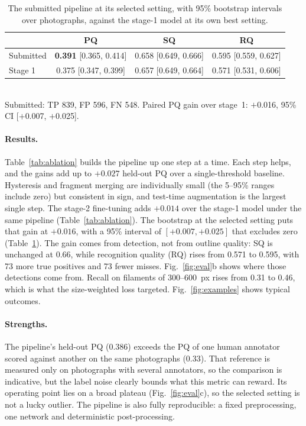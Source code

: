 \documentclass[sigconf]{acmart}
\begin{document}
\begin{table}[t]
  \caption{The submitted pipeline at its selected setting, with 95\% bootstrap intervals over photographs, against the stage-1 model at its own best setting.}
  \label{tab:final}
  \footnotesize\setlength{\tabcolsep}{3pt}
  \begin{tabular}{@{}lccc@{}}
    \toprule
     & PQ & SQ & RQ \\
    \midrule
    Submitted & \textbf{0.391} [0.365, 0.414] & 0.658 [0.649, 0.666] & 0.595 [0.559, 0.627] \\
    Stage 1   & 0.375 [0.347, 0.399] & 0.657 [0.649, 0.664] & 0.571 [0.531, 0.606] \\
    \bottomrule
  \end{tabular}\\[2pt]
  \footnotesize Submitted: TP 839, FP 596, FN 548. Paired PQ gain over stage~1: $+$0.016, 95\% CI [$+$0.007, $+$0.025].
\end{table}

\paragraph{Results.}
Table~\ref{tab:ablation} builds the pipeline up one step at a time. Each step helps, and the gains add up to $+0.027$ held-out PQ over a single-threshold baseline. Hysteresis and fragment merging are individually small (the 5--95\% ranges include zero) but consistent in sign, and test-time augmentation is the largest single step. The stage-2 fine-tuning adds $+0.014$ over the stage-1 model under the same pipeline (Table~\ref{tab:ablation}). The bootstrap at the selected setting puts that gain at $+0.016$, with a 95\% interval of $[+0.007, +0.025]$ that excludes zero (Table~\ref{tab:final}). The gain comes from detection, not from outline quality: SQ is unchanged at 0.66, while recognition quality (RQ) rises from 0.571 to 0.595, with 73 more true positives and 73 fewer misses. Fig.~\ref{fig:eval}b shows where those detections come from. Recall on filaments of 300--600~px rises from 0.31 to 0.46, which is what the size-weighted loss targeted. Fig.~\ref{fig:examples} shows typical outcomes.

\paragraph{Strengths.}
The pipeline's held-out PQ (0.386) exceeds the PQ of one human annotator scored against another on the same photographs (0.33). That reference is measured only on photographs with several annotators, so the comparison is indicative, but the label noise clearly bounds what this metric can reward. Its operating point lies on a broad plateau (Fig.~\ref{fig:eval}c), so the selected setting is not a lucky outlier. The pipeline is also fully reproducible: a fixed preprocessing, one network and deterministic post-processing.
\end{document}
